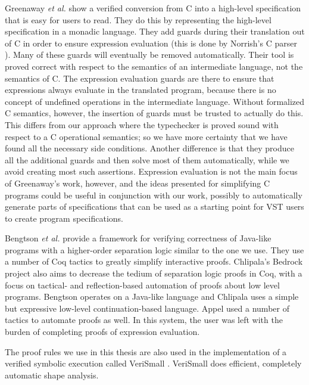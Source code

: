 \documentclass{puthesis}
\begin{document}
Greenaway \emph{et al.} \cite{greenaway12} show a verified conversion
from C into a high-level specification that is easy for users to
read. They do this by representing the high-level specification in a
monadic language.  They add guards during their translation out of C
in order to ensure expression evaluation (this is done by Norrish's C
parser \cite{norrish:parser}). Many of these guards will eventually be
removed automatically. Their tool is proved correct with respect to
the semantics of an intermediate language, not the semantics of C. The
expression evaluation guards are there to ensure that expressions
always evaluate in the translated program, because there is no concept
of undefined operations in the intermediate language.  Without
formalized C semantics, however, the insertion of guards must be
trusted to actually do this. This differs from our approach where the
typechecker is proved sound with respect to a C operational semantics;
so we have more certainty that we have found all the necessary side
conditions.  Another difference is that they produce all the
additional guards and then solve most of them automatically, while we
avoid creating most such assertions. Expression evaluation is not the
main focus of Greenaway's work, however, and the ideas presented for
simplifying C programs could be useful in conjunction with our work,
possibly to automatically generate parts of specifications that can be
used as a starting point for VST users to create program
specifications.

Bengtson \emph{et al.} \cite{bengtson12:Charge} provide a framework for verifying
correctness of Java-like programs with a higher-order separation logic similar
to the one we use. They use a number of Coq tactics to greatly simplify
interactive proofs. Chlipala's Bedrock project
\cite{chlipala11:pldi} also aims to decrease the tedium of separation logic
proofs in Coq, with a focus on tactical- and reflection-based 
automation of proofs about low level programs. Bengtson operates on a Java-like
language and Chlipala uses a simple but expressive low-level
continuation-based language.
Appel \cite{appel06} used a number of
tactics to automate proofs as well. In this system, the user was left with the
burden of completing proofs of expression evaluation.

The proof rules we use in this thesis are also used in the implementation of a
verified symbolic execution called VeriSmall \cite{appel11:cpp}. 
VeriSmall does efficient, completely automatic 
shape analysis.  
\end{document}
